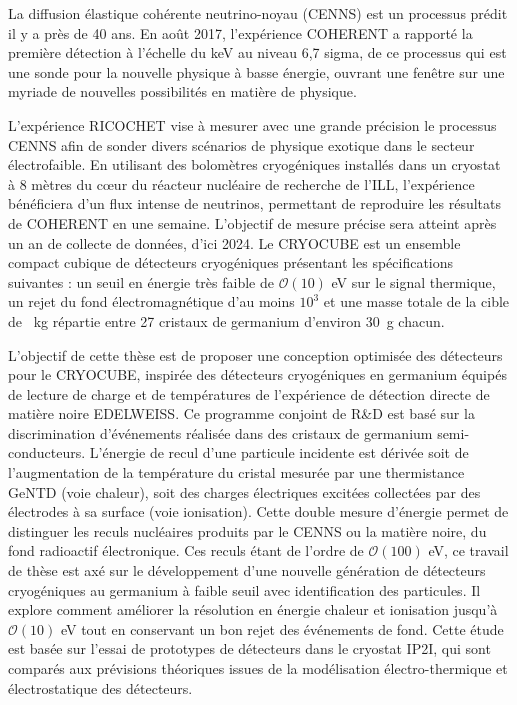\documentclass[
11pt, %
english, %
singlespacing, %
headsepline, %
]{MastersDoctoralThesis} %
\begin{document}
\begin{abstractfr}
\addchaptertocentry{\abstractnamefr} %

{\small

La diffusion élastique cohérente neutrino-noyau (CENNS) est un processus prédit il y a près de 40 ans. En août 2017, l'expérience COHERENT a rapporté la première détection à l’échelle du \si{\kilo\eV} au niveau 6,7 sigma, de ce processus qui est une sonde pour la nouvelle physique à basse énergie, ouvrant une fenêtre sur une myriade de nouvelles possibilités en matière de physique.

L'expérience RICOCHET vise à mesurer avec une grande précision le processus CENNS afin de sonder divers scénarios de physique exotique dans le secteur électrofaible. En utilisant des bolomètres cryogéniques installés dans un cryostat à 8 mètres du cœur du réacteur nucléaire de recherche de l'ILL, l’expérience bénéficiera d'un flux intense de neutrinos, permettant de reproduire les résultats de COHERENT en une semaine. L'objectif de mesure précise sera atteint après un an de collecte de données, d’ici 2024.
Le CRYOCUBE est un ensemble compact cubique de détecteurs cryogéniques présentant les spécifications suivantes : un seuil en énergie très faible de $\mathcal{O}(10)$ eV sur le signal thermique, un rejet du fond électromagnétique d'au moins $10^3$ et une masse totale de la cible de \SI{}{\kg} répartie entre 27 cristaux de germanium d'environ \SI{30}{\g} chacun.

L'objectif de cette thèse est de proposer une conception optimisée des détecteurs pour le CRYOCUBE, inspirée des détecteurs cryogéniques en germanium équipés de lecture de charge et de températures de l'expérience de détection directe de matière noire EDELWEISS. Ce programme conjoint de R\&D est basé sur la discrimination d'événements réalisée dans des cristaux de germanium semi-conducteurs. L'énergie de recul d'une particule incidente est dérivée soit de l'augmentation de la température du cristal mesurée par une thermistance GeNTD (voie chaleur), soit des charges électriques excitées collectées par des électrodes à sa surface (voie ionisation). Cette double mesure d'énergie permet de distinguer les reculs nucléaires produits par le CENNS ou la matière noire, du fond radioactif électronique. Ces reculs étant de l’ordre de $\mathcal{O}(100)$ \si{eV}, ce travail de thèse est axé sur le développement d'une nouvelle génération de détecteurs cryogéniques au germanium à faible seuil avec identification des particules. Il explore comment améliorer la résolution en énergie chaleur et ionisation jusqu'à $\mathcal{O}(10)$ \si{eV} tout en conservant un bon rejet des événements de fond. Cette étude est basée sur l'essai de prototypes de détecteurs dans le cryostat IP2I, qui sont comparés aux prévisions théoriques issues de la modélisation électro-thermique et électrostatique des détecteurs.

}
\end{abstractfr}
\end{document}
